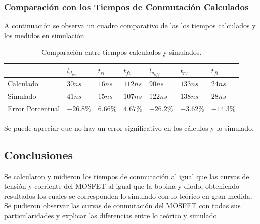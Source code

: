 \subsubsection{Comparación con los Tiempos de Conmutación Calculados}


A continuación se observa un cuadro comparativo de las los tiempos calculados y los medidos en simulación.
\begin{table}[H]
\centering
\begin{tabular}{@{}lllllll@{}}
\toprule
 & $t_{d_{on}}$ & $t_{ri}$ & $t_{fv}$ & $t_{d_{off}}$ & $t_{rv}$ & $t_{fi}$ \\ \midrule
Calculado & $30ns$ & $16ns$ & $112ns$ & $90ns$ & $133ns$ & $24ns$ \\
Simulado & $41ns$ & $15ns$ & $107ns$ & $122ns$ & $138ns$ & $28ns$ \\
Error Porcentual & $-26.8\%$ & $6.66\%$ & $4.67\%$ & $-26.2\%$ & $-3.62\%$ & $-14.3\%$ \\ \bottomrule
\end{tabular}
\caption{Comparación entre tiempos calculados y simulados.}
\end{table}
Se puede apreciar que no hay un error significativo en los cálculos y lo simulado.

\subsection{Conclusiones}
Se calcularon y midieron los tiempos de conmutación al igual que las curvas de tensión y corriente del MOSFET al igual que la bobina y diodo, obteniendo resultados los cuales se corresponden lo simulado con lo teórico en gran medida. Se pudieron observar las curvas de conmutación del MOSFET con todas sus particularidades y explicar las diferencias entre lo teórico y simulado.

